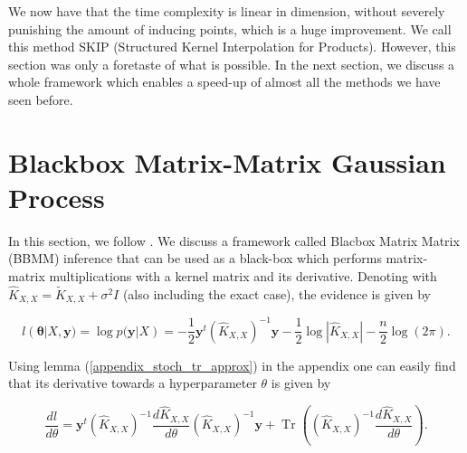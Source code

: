 \documentclass[12pt,a4paper,oneside]{book}
\DeclareMathOperator{\Tr}{Tr}
\begin{document}
We now have that the time complexity is linear in dimension, without severely punishing the amount of inducing points,  which is a huge improvement. We call this method SKIP (Structured Kernel Interpolation for Products). However, this section was only a foretaste of what is possible. In the next section, we discuss a whole framework which enables a speed-up of almost all the methods we have seen before. 

\section{Blackbox Matrix-Matrix Gaussian Process}\label{section_BBMM}

In this section, we follow \cite{gardner2018gpytorch}. We discuss a framework called Blacbox Matrix Matrix (BBMM) inference that can be used as a black-box which performs matrix-matrix multiplications with a kernel matrix and its derivative.  Denoting with $\hat{K}_{X,X} = \tilde{K}_{X,X} + \sigma^2 I$ (also including the exact case), the evidence is given by 

\begin{equation}
l(\bm{\theta} | X, \bm{y}) = \log p(\bm{y}|X) = -\dfrac{1}{2} \bm{y}^t (\hat{K}_{X,X})^{-1} \bm{y} -\dfrac{1}{2} \log |\hat{K}_{X,X}| - \dfrac{n}{2}  \log(2 \pi).
\end{equation}

Using lemma (\ref{appendix_stoch_tr_approx}) in the appendix one can easily find that its derivative towards a hyperparameter $\theta$ is given by

\begin{equation}
\dfrac{dl}{d \theta} = \bm{y}^t (\hat{K}_{X,X})^{-1} \dfrac{d \hat{K}_{X,X}}{d \theta} (\hat{K}_{X,X})^{-1} \bm{y} + \Tr \left( (\hat{K}_{X,X})^{-1} \dfrac{d \hat{K}_{X,X}}{d \theta} \right).
\end{equation}
\end{document}
